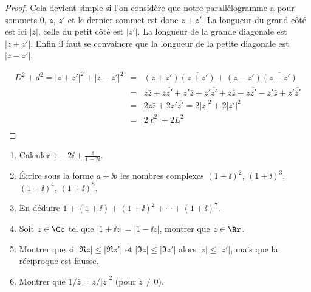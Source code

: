 \documentclass[class=report,crop=false]{standalone}
\begin{document}
\begin{proof}
Cela devient simple si l'on considère que notre parallélogramme a pour sommets
$0$, $z$, $z'$ et le dernier sommet est donc $z+z'$.
La longueur du grand côté est ici $|z|$, celle du petit côté est $|z'|$.
La longueur de la grande diagonale est $|z+z'|$. Enfin il faut se convaincre que
la longueur de la petite diagonale est $|z-z'|$.



  \begin{eqnarray*}
    D^2 + d^2 = \left| z + z' \right|^2 + \left| z - z' \right|^2 & = & \left( z + z'
    \right)  \overline{\left( z + z' \right)} + \left( z - z' \right)
    \overline{\left( z - z' \right)}\\
    & = & z \bar{z} + z \overline{z'} + z'  \bar{z} + z'  \overline{z'} + z
    \bar{z} - z \overline{z'} - z'  \bar{z} + z'  \overline{z'}\\
    & = & 2 z \bar{z} + 2 z'  \overline{z'} = 2 \left| z \right|^2 + 2 \left|    z' \right|^2 \\
    & = & 2\ell^2+2L^2 \\
  \end{eqnarray*}
\end{proof}



\begin{miniexercices}
\sauteligne
\begin{enumerate}
  \item Calculer $1 - 2\ii + \frac{\ii}{1 - 2\ii}$.
  \item \'Ecrire sous la forme $a+\ii b$ les nombres complexes $(1+\ii)^2$,
$(1+\ii)^3$, $(1+\ii)^4$, $(1+\ii)^8$.
  \item En déduire $1+(1+\ii)+(1+\ii)^2+\cdots +(1+\ii)^7$.
  \item Soit $z\in \Cc$ tel que $|1+ \ii z| = |1-\ii z|$, montrer que $z \in \Rr$.
  \item Montrer que si $|\Re z| \le |\Re z'|$ et $|\Im z| \le |\Im z'|$ alors
$|z| \le |z'|$, mais que la réciproque est fausse.
  \item Montrer que $1 / \bar{z} = z/\left| z \right|^2$ (pour $z\neq 0$).
\end{enumerate}
\end{miniexercices}
\end{document}
